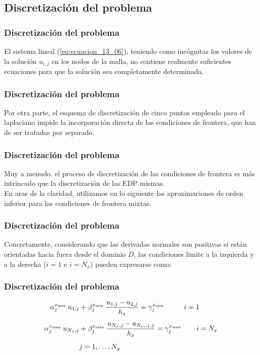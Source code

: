\subsection{Discretización del problema}
\begin{frame}
\frametitle{Discretización del problema}
El sistema lineal (\ref{eq:ecuacion_13_06}), teniendo como incógnitas los valores de la solución $u_{i, j}$ en los nodos de la malla, no contiene realmente suficientes ecuaciones para que la solución sea completamente determinada. 
\end{frame}
\begin{frame}
\frametitle{Discretización del problema}
Por otra parte, el esquema de discretización de cinco puntos empleado para el laplaciano impide la incorporación directa de las condiciones de frontera, que han de ser tratadas por separado.
\end{frame}
\begin{frame}
\frametitle{Discretización del problema}
Muy a menudo, el proceso de discretización de las condiciones de frontera es más intrincado que la discretización de las EDP mismas.
\\
\bigskip
En aras de la claridad, utilizamos en lo siguiente las aproximaciones de orden inferior para las condiciones de frontera mixtas.
\end{frame}
\begin{frame}
\frametitle{Discretización del problema}
Concretamente, considerando que las derivadas normales son positivas si están orientadas hacia fuera desde el dominio $D$, las condiciones límite a la izquierda y a la derecha ($i = 1$ e $i = N_{x}$) pueden expresarse como:
\end{frame}
\begin{frame}
\frametitle{Discretización del problema}
\begin{align*}
\alpha_{j}^{x_{\text{\tiny{min}}}} \: u_{1, j} &+ \beta_{j}^{x_{\text{\tiny{min}}}} \: \dfrac{u_{1, j} - u_{2, j}}{h_{x}} = \gamma_{j}^{x_{\text{\tiny{min}}}} \hspace{1cm} i = 1 \\[0.5em]
\alpha_{j}^{x_{\mbox{\tiny{max}}}} \: u_{N_{x}, j} &+ \beta_{j}^{x_{\text{\tiny{max}}}} \: \dfrac{u_{N_{x}, j} - u_{N_{x-1}, j}}{h_{x}} = \gamma_{j}^{x_{\text{\tiny{max}}}} \hspace{0.75cm} i = N_{x} \\[0.5em]
&j = 1, \ldots, N_{y}
\end{align*}
\end{frame}

